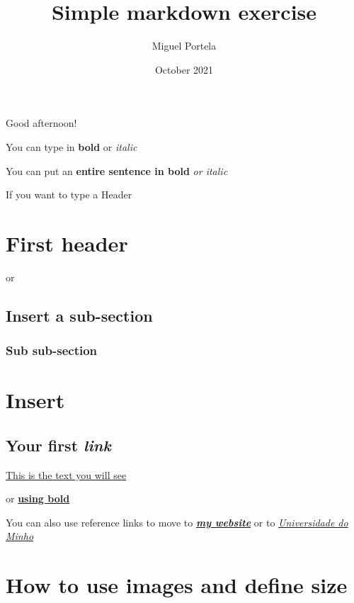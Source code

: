 \documentclass[
]{article}
\title{Simple markdown exercise}
\author{Miguel Portela}
\date{October 2021}
\begin{document}
\maketitle

Good afternoon!

You can type in \textbf{bold} or \emph{italic}

You can put an \textbf{entire sentence in bold} \emph{or italic}

If you want to type a Header

\hypertarget{first-header}{%
\section{First header}\label{first-header}}

or

\hypertarget{insert-a-sub-section}{%
\subsection{Insert a sub-section}\label{insert-a-sub-section}}

\hypertarget{sub-sub-section}{%
\subsubsection{Sub sub-section}\label{sub-sub-section}}

\hypertarget{insert}{%
\section{Insert}\label{insert}}

\hypertarget{your-first-link}{%
\subsection{\texorpdfstring{Your first
\emph{link}}{Your first link}}\label{your-first-link}}

\href{https://www.markdowntutorial.com/}{This is the text you will see}

or \href{https://www.markdowntutorial.com/}{\textbf{using bold}}

You can also use reference links to move to
\href{http://www1.eeg.uminho.pt/economia/mangelo/}{\emph{\textbf{my
website}}} or to \href{https://www.uminho.pt/EN/}{\emph{Universidade do
Minho}}

\hypertarget{how-to-use-images-and-define-size}{%
\section{How to use images and define
size}\label{how-to-use-images-and-define-size}}
\end{document}
